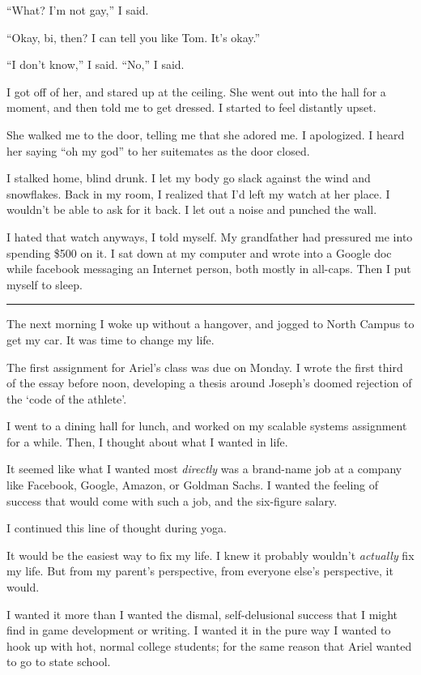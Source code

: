 ``What?  I'm not gay,'' I said.

``Okay, bi, then?  I can tell you like Tom.  It's okay.''

``I don't know,'' I said.  ``No,'' I said.

I got off of her, and stared up at the ceiling.  She went out into the hall for
a moment, and then told me to get dressed.  I started to feel distantly upset.

She walked me to the door, telling me that she adored me.  I apologized.  I
heard her saying ``oh my god'' to her suitemates as the door closed.

I stalked home, blind drunk.  I let my body go slack against the wind and
snowflakes.  Back in my room, I realized that I'd left my watch at her place.  I
wouldn't be able to ask for it back.  I let out a noise and punched the wall.

I hated that watch anyways, I told myself.  My grandfather had pressured me into
spending \$500 on it.   I sat down at my computer and wrote into a Google doc
while facebook messaging an Internet person, both mostly in all-caps.  Then I
put myself to sleep.

\plainfancybreak{12pt}{2}{}

The next morning I woke up without a hangover, and jogged to North Campus to get
my car.  It was time to change my life.

The first assignment for Ariel's class was due on Monday.  I wrote the first
third of the essay before noon, developing a thesis around Joseph's doomed
rejection of the `code of the athlete'.

I went to a dining hall for lunch, and worked on my scalable systems assignment
for a while.  Then, I thought about what I wanted in life.

It seemed like what I wanted most \textit{directly} was a brand-name job at a
company like Facebook, Google, Amazon, or Goldman Sachs.  I wanted the feeling
of success that would come with such a job, and the six-figure salary.

I continued this line of thought during yoga.

It would be the easiest way to fix my life.  I knew it probably wouldn't
\textit{actually} fix my life.  But from my parent's perspective, from everyone
else's perspective, it would.

I wanted it more than I wanted the dismal, self-delusional success that I might
find in game development or writing.  I wanted it in the pure way I wanted to
hook up with hot, normal college students; for the same reason that Ariel
wanted to go to state school.

